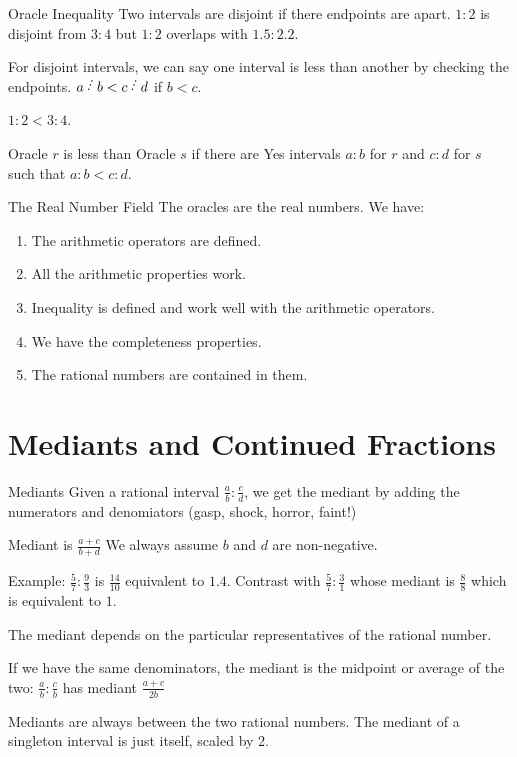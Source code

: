 \documentclass{beamer}
\begin{document}
\begin{frame}{Oracle Inequality}
    Two intervals are disjoint if there endpoints are apart.  $1:2$ is disjoint from $3:4$ but $1:2$ overlaps with $1.5:2.2$.

    For disjoint intervals, we can say one interval is less than another by checking the endpoints. $a\lte b < c \lte d$ if $b<c$.

    $1:2 < 3:4$.

    Oracle $r$ is less than Oracle $s$ if there are Yes intervals $a:b$ for $r$ and $c:d$ for $s$ such that $a:b < c:d$.

\end{frame}


\begin{frame}{The Real Number Field}
    The oracles are the real numbers. We have:

    \begin{enumerate}
        \item The arithmetic operators are defined.
        \item All the arithmetic properties work.
        \item Inequality is defined and work well with the arithmetic operators.
        \item We have the completeness properties. 
        \item The rational numbers are contained in them. 
    \end{enumerate}
    
\end{frame}

\section{Mediants and Continued Fractions}

\begin{frame}{Mediants}
    Given a rational interval $\frac{a}{b} : \frac{c}{d}$, we get the mediant by adding the numerators and denomiators (gasp, shock, horror, faint!)

    Mediant is $\frac{a+c}{b+d}$  We always assume $b$ and $d$ are non-negative. 

    Example:  $\frac{5}{7}:\frac{9}{3}$ is $\frac{14}{10}$ equivalent to $1.4$. Contrast with $\frac{5}{7}:\frac{3}{1}$ whose mediant is $\frac{8}{8}$ which is equivalent to $1$.

    The mediant depends on the particular representatives of the rational number. 

    If we have the same denominators, the mediant is the midpoint or average of the two: $\frac{a}{b}:\frac{c}{b}$ has mediant $\frac{a+c}{2b}$

    Mediants are always between the two rational numbers. The mediant of a singleton interval is just itself, scaled by 2.  
    
\end{frame}
\end{document}

